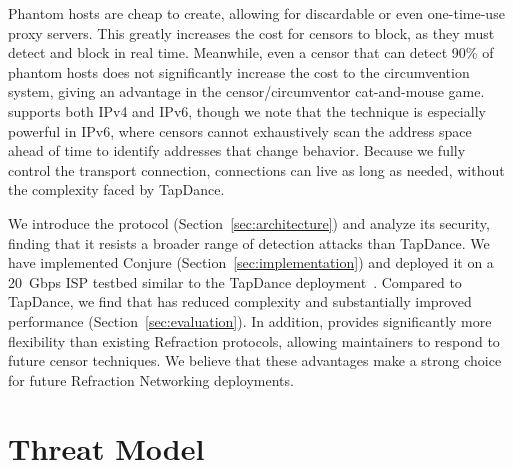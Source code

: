 \documentclass[sigconf]{acmart}
\begin{document}
Phantom hosts are cheap to create, allowing for discardable or even one-time-use
proxy servers. This greatly increases the cost for censors to
block, as they must detect and block in real time. Meanwhile, even a censor that
can detect 90\% of phantom hosts does not significantly increase the cost to the
circumvention system, giving \scheme an advantage in the censor/circumventor
cat-and-mouse game.
\scheme supports both IPv4 and IPv6,
though we note that the technique is especially
powerful in IPv6, where censors cannot exhaustively scan the address space
ahead of time to identify addresses that change behavior.
Because we fully control the transport connection, connections can live as
long as needed, without the complexity faced by TapDance.




We introduce the \scheme protocol (Section~\ref{sec:architecture})
and analyze its security, finding that it resists a broader
range of detection attacks than TapDance.
We have implemented Conjure (Section~\ref{sec:implementation})
and deployed it on a 20~Gbps ISP testbed similar to the TapDance
deployment~\cite{frolov2017isp}.  Compared to TapDance, we find that
\scheme has reduced complexity and substantially improved performance
(Section~\ref{sec:evaluation}).  In addition, \scheme provides significantly
more flexibility than existing Refraction protocols, allowing maintainers to
respond to future censor techniques.
We believe that these advantages
make \scheme a strong choice for future Refraction Networking deployments.




\section{Threat Model}
\end{document}
